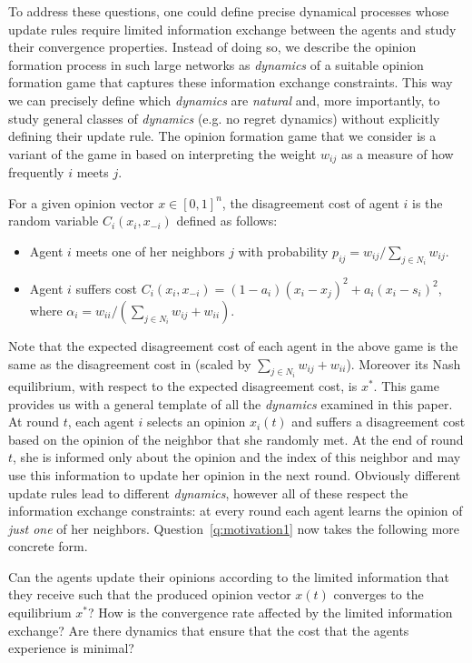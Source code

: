 To address these questions, one could define precise dynamical processes whose
update rules require limited information exchange between the agents and study
their convergence properties. Instead of doing so, we describe the opinion
formation process in such large networks as \emph{dynamics} of a suitable
opinion formation game that captures these information exchange constraints.
This way we can precisely define which \emph{dynamics} are \emph{natural} and,
more importantly, to study general classes of \emph{dynamics} (e.g. no regret
dynamics) without explicitly defining their update rule.  The opinion formation
game that we consider is a variant of the game in \cite{BKO11} based on
interpreting the weight $w_{ij}$ as a measure of how frequently $i$ meets $j$.
%
\begin{definition}\label{d:random_game}
  For a given opinion vector $x \in [0,1]^n$, the disagreement cost of agent
  $i$ is the random variable $C_i(x_i,x_{-i})$ defined as follows:
  \begin{itemize}
    \item Agent $i$ meets one of her neighbors $j$ with probability $p_{ij}=
      w_{ij}/\sum_{j\in N_i}w_{ij}$.
    \item Agent $i$ suffers cost $C_i(x_i , x_{-i}) = (1-a_i)(x_i-x_j)^2 +
      a_i(x_i-s_i)^2$, where $\alpha_i = w_{ii}/(\sum_{j\in
        N_i}w_{ij}+w_{ii})$.
  \end{itemize}
\end{definition}
%
Note that the expected disagreement cost of each agent in the above game
is the same as the disagreement cost in \cite{BKO11} (scaled by $\sum_{j \in N_i}w_{ij}+w_{ii}$). 
Moreover its Nash equilibrium, with respect to the expected disagreement cost, is $x^*$.
This game provides us with a general template of all the \emph{dynamics} examined in this paper.  At
round $t$, each agent $i$ selects an opinion $x_i(t)$ and suffers a
disagreement cost based on the opinion of the neighbor that she randomly met.
At the end of round $t$, she is informed only about the opinion and the
index of this neighbor and may use this information to update her opinion in
the next round.  Obviously different update rules lead to different
\emph{dynamics}, however all of these respect the information exchange
constraints: at every round each agent learns the opinion of \emph{just one} of
her neighbors.  Question~\ref{q:motivation1} now takes the following more
concrete form.

\begin{question}\label{q:motivation2}
  Can the agents update their opinions according to the limited information
  that they receive such that the produced opinion vector $x(t)$ converges
  to the equilibrium $x^*$? How is the convergence rate affected by the limited
  information exchange? Are there dynamics that ensure that the cost that the agents experience
  is minimal?
\end{question}

